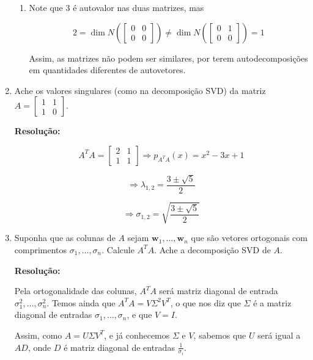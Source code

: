 \documentclass[leqno]{article}
\begin{document}
\begin{enumerate}
\begin{enumerate}
        \item Note que $3$ é autovalor nas duas matrizes, mas
        
        $$2=\dim N\left(\begin{bmatrix}0 & 0\\
        0 & 0\end{bmatrix}\right)\neq\dim N\left(\begin{bmatrix}0 & 1\\
        0 & 0\end{bmatrix}\right)=1$$
        
        Assim, as matrizes não podem ser similares, por terem autodecomposições em quantidades diferentes de autovetores.
    \end{enumerate}
    
    \item Ache os valores singulares (como na decomposição SVD) da matriz $A=\begin{bmatrix}1 & 1\\
    1 & 0\end{bmatrix}$.
    
    \textbf{Resolução:}
    
    $$A^TA=\begin{bmatrix}2 & 1\\
    1 & 1\end{bmatrix}\Rightarrow p_{A^TA}(x)=x^2-3x+1$$
    
    $$\Rightarrow\lambda_{1,2}=\frac{3\pm\sqrt{5}}{2}$$
    
    $$\Rightarrow\sigma_{1,2}=\sqrt{\frac{3\pm\sqrt{5}}{2}}$$
    
    \item Suponha que as colunas de $A$ sejam $\textbf{w}_1, \dots,\textbf{w}_n$ que são vetores ortogonais com comprimentos $\sigma_1,\dots, \sigma_n$. Calcule $A^TA$. Ache a decomposição SVD de $A$.
    
    \textbf{Resolução:}
    
    Pela ortogonalidade das colunas, $A^TA$ será matriz diagonal de entrada $\sigma^2_1,\dots, \sigma_n^2$. Temos ainda que $A^TA=V\Sigma^2V^T$, o que nos diz que $\Sigma$ é a matriz diagonal de entradas $\sigma_1,\dots,\sigma_n$, e que $V=I$.
    
    Assim, como $A=U\Sigma V^T$, e já conhecemos $\Sigma$ e $V$, sabemos que $U$ será igual a $AD$, onde $D$ é matriz diagonal de entradas $\frac{1}{\sigma_i}$.
    
\end{enumerate}

 
\end{document}
